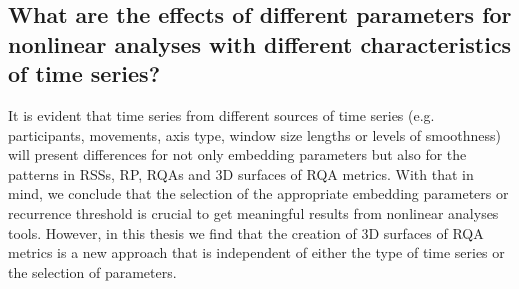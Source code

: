 %
%
%
%
%
%
%



\subsection*{What are the effects 
	of different parameters for nonlinear analyses 
	with different characteristics of time series?}

It is evident that time series from different sources 
of time series (e.g. participants, movements, axis type, window size lengths 
or levels of smoothness) will present differences for not only
embedding parameters but also for the patterns in RSSs, RP, RQAs 
and 3D surfaces of RQA metrics.
With that in mind, we conclude that the selection of the appropriate
embedding parameters or recurrence threshold is crucial to get 
meaningful results from nonlinear analyses tools. However, in this 
thesis we find that the creation of 3D surfaces of RQA metrics is 
a new approach that is independent of either the type of time series
or the selection of parameters.

